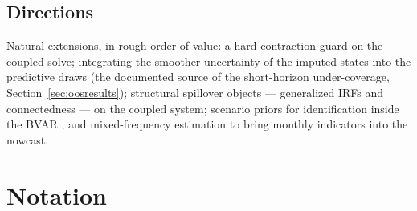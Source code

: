 \documentclass[11pt]{article}
\theoremstyle{plain}
\theoremstyle{remark}
\begin{document}
\subsection{Directions}\label{sec:future}

Natural extensions, in rough order of value: a hard contraction guard on
the coupled solve; integrating the smoother uncertainty of the imputed
states into the predictive draws (the documented source of the
short-horizon under-coverage, Section~\ref{sec:oosresults}); structural
spillover objects --- generalized IRFs and connectedness --- on the
coupled system; scenario priors for identification inside the BVAR
\citep{FarkasJakab2026}; and mixed-frequency estimation to bring monthly
indicators into the nowcast.

\appendix
\section{Notation}\label{app:notation}
\end{document}
